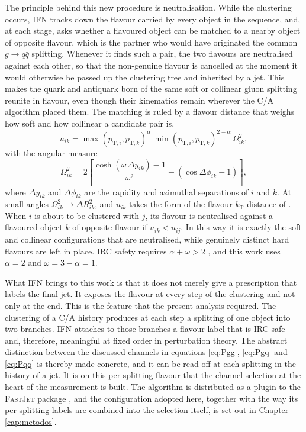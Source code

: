 The principle behind this new procedure is neutralisation. While the clustering occurs,
IFN tracks down the flavour carried by every object in the sequence, and, at each stage,
asks whether a flavoured object can be matched to a nearby object of opposite flavour,
which is the partner who would have originated the common $g \to q\bar{q}$ splitting.
Whenever it finds such a pair, the two flavours are neutralised against each other,
so that the non-genuine flavour is cancelled at the moment it would otherwise be passed
up the clustering tree and inherited by a jet. This makes the quark and antiquark born
of the same soft or collinear gluon splitting reunite in flavour, even though their kinematics
remain wherever the C/A algorithm placed them. The matching is ruled by a flavour distance that weighs how soft
and how collinear a candidate pair is,
\begin{equation}
  u_{ik} = \max(p_{\mathrm{T},i},p_{\mathrm{T},k})^{\alpha}\,
           \min(p_{\mathrm{T},i},p_{\mathrm{T},k})^{2-\alpha}\,
           \Omega_{ik}^{2},
  \label{eq:ifn_uik}
\end{equation}
with the angular measure
\begin{equation}
  \Omega_{ik}^{2} = 2\left[\frac{\cosh(\omega\,\Delta y_{ik})-1}
                    {\omega^{2}}-\left(\cos\Delta\phi_{ik}-1\right)
                    \right],
  \label{eq:ifn_omega}
\end{equation}
where $\Delta y_{ik}$ and $\Delta\phi_{ik}$ are the rapidity and
azimuthal separations of $i$ and $k$. At small angles
$\Omega_{ik}^{2}\to\Delta R_{ik}^{2}$, and $u_{ik}$ takes the
form of the flavour-$k_\mathrm{T}$ distance of \cite{Banfi_2006}. When
$i$ is about to be clustered with $j$, its flavour is neutralised
against a flavoured object $k$ of opposite flavour if
$u_{ik}<u_{ij}$. In this way it is exactly the soft and collinear
configurations that are neutralised, while genuinely distinct
hard flavours are left in place. IRC safety requires
$\alpha+\omega>2$ \cite{caola2023flavouredjetsexactantikt}, and this work uses $\alpha=2$ and
$\omega=3-\alpha=1$.

What IFN brings to this work is that it does not merely give a prescription that labels
the final jet. It exposes the flavour at every step of the clustering and not only at the end.
This is the feature that the present analysis required. The clustering of a
C/A history produces at each step a splitting of one object into two branches. IFN
attaches to those branches a flavour label that is IRC safe and, therefore, meaningful
at fixed order in perturbation theory. The abstract distinction between the discussed
channels in equations \eqref{eq:Pgg}, \eqref{eq:Pgq} and \eqref{eq:Pqq} is thereby made concrete, and
it can be read off at each splitting in the history of a jet. It is on this per splitting flavour
that the channel selection at the heart of the measurement is built.
The algorithm is distributed as a
plugin to the \textsc{FastJet} package \cite{Cacciari_2012}, and the configuration
adopted here, together with the way its per-splitting labels are combined into the
selection itself, is set out in Chapter \ref{cap:metodos}.

